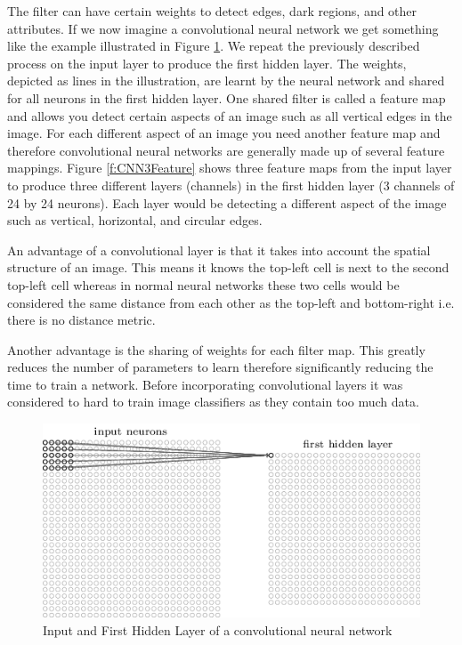 \documentclass{bhamthesis}
\theoremstyle{definition}
\begin{document}
The filter can have certain weights to detect edges, dark regions, and other attributes. If we now imagine a convolutional neural network we get something like the example illustrated in Figure \ref{f:CNNInput}. We repeat the previously described process on the input layer to produce the first hidden layer. The weights, depicted as lines in the illustration, are learnt by the neural network and shared for all neurons in the first hidden layer. One shared filter is called a feature map and allows you detect certain aspects of an image such as all vertical edges in the image. For each different aspect of an image you need another feature map and therefore convolutional neural networks are generally made up of several feature mappings. Figure \ref{f:CNN3Feature} shows three feature maps from the input layer to produce three different layers (channels) in the first hidden layer (3 channels of 24 by 24 neurons). Each layer would be detecting a different aspect of the image such as vertical, horizontal, and circular edges.

An advantage of a convolutional layer is that it takes into account the spatial structure of an image. This means it knows the top-left cell is next to the second top-left cell whereas in normal neural networks these two cells would be considered the same distance from each other as the top-left and bottom-right i.e. there is no distance metric.

Another advantage is the sharing of weights for each filter map. This greatly reduces the number of parameters to learn therefore significantly reducing the time to train a network. Before incorporating convolutional layers it was considered to hard to train image classifiers as they contain too much data.

\begin{figure}
	\includegraphics[width=\textwidth]{media/img/cnnInputAndHidden}
	\caption{Input and First Hidden Layer of a convolutional neural network \cite{Neilsen2015}}\label{f:CNNInput}
\end{figure}
\end{document}
